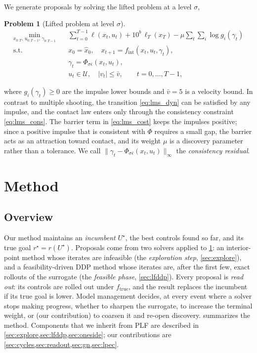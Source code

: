 \documentclass[11pt]{article}
\newtheorem{problem}{Problem}
\theoremstyle{remark}
\newcommand{\ftrue}{f_{\mathrm{true}}}
\newcommand{\fint}{f_{\mathrm{int}}}
\newcommand{\epsref}{\bar{\epsilon}}
\newcommand{\U}{\mathcal{U}}
\newcommand{\inc}{U^\star}
\newcommand{\rinc}{r^\star}
\begin{document}
We generate proposals by solving the lifted problem at a level $\sigma$,
\begin{problem}[Lifted problem at level $\sigma$]
\label{prob:lms}
\begin{subequations}
\label{eq:lms}
\begin{align}
\min_{x_{0:T},\, u_{0:T-1},\, \gamma_{0:T-1}} \quad & \textstyle\sum_{t=0}^{T-1} \ell(x_t, u_t) + 10^{b}\, \ell_T(x_T) - \mu \sum_{t} \sum_{i} \log g_i(\gamma_t) \label{eq:lms_cost}\\
\text{s.t.} \quad & x_0 = \hat x_0, \quad x_{t+1} = \fint(x_t, u_t, \gamma_t), \label{eq:lms_dyn}\\
& \gamma_t = \Phi_{\sigma\epsref}(x_t, u_t), \label{eq:lms_cons}\\
& u_t \in \U, \quad |v_t| \leq \bar v, \qquad t = 0, \dots, T-1, \label{eq:lms_ineq}
\end{align}
\end{subequations}
\end{problem}
where $g_i(\gamma_t) \geq 0$ are the impulse lower bounds and $\bar v = 5$ is a velocity bound. In contrast to multiple shooting, the transition \cref{eq:lms_dyn} can be satisfied by any impulse, and the contact law enters only through the consistency constraint \cref{eq:lms_cons}. The barrier term in \cref{eq:lms_cost} keeps the impulses positive; since a positive impulse that is consistent with $\Phi$ requires a small gap, the barrier acts as an attraction toward contact, and its weight $\mu$ is a discovery parameter rather than a tolerance. We call $\|\gamma_t - \Phi_{\sigma\epsref}(x_t, u_t)\|_\infty$ the \emph{consistency residual}.

\section{Method}
\label{sec:method}

\subsection{Overview}
\label{sec:overview}

Our method maintains an \emph{incumbent} $\inc$, the best controls found so far, and its true goal $\rinc = r(\inc)$. Proposals come from two solvers applied to \cref{prob:lms}: an interior-point method whose iterates are infeasible (the \emph{exploration step}, \cref{sec:explore}), and a feasibility-driven DDP method whose iterates are, after the first few, exact rollouts of the surrogate (the \emph{feasible phase}, \cref{sec:lfddp}). Every proposal is \emph{read out}: its controls are rolled out under $\ftrue$, and the result replaces the incumbent if its true goal is lower. Model management decides, at every event where a solver stops making progress, whether to sharpen the surrogate, to increase the terminal weight, or (our contribution) to coarsen it and re-open discovery.  summarizes the method. Components that we inherit from PLF are described in \cref{sec:explore,sec:lfddp,sec:oneside}; our contributions are \cref{sec:cycles,sec:readout,sec:gn,sec:lpec}.
\end{document}
